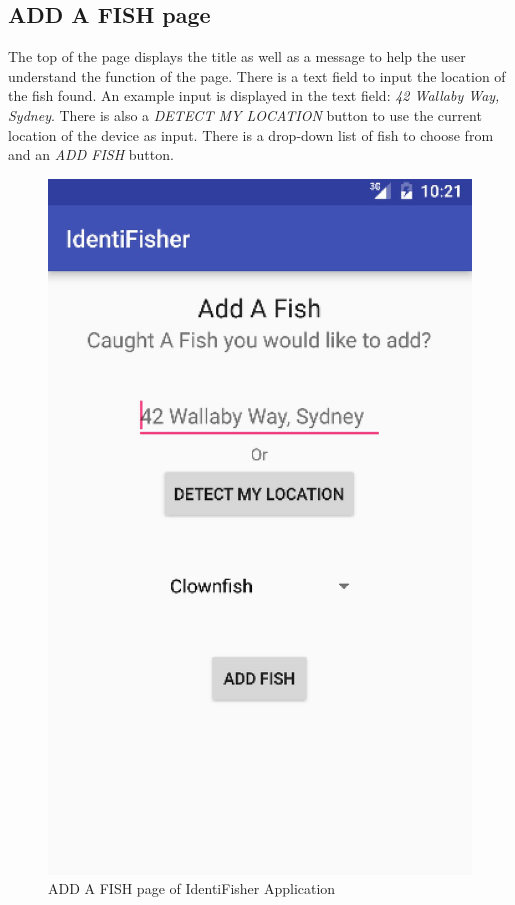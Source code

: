 \documentclass{article}
\begin{document}
\subsection{ADD A FISH page}
The top of the page displays the title as well as a message to help the user understand the function of the page. There is a text field to input the
location of the fish found. An example input is displayed in the text field: \textit{42 Wallaby Way, Sydney}. There is also a \textit{DETECT MY LOCATION} button
to use the current location of the device as input. There is a drop-down list of fish to choose from and an \textit{ADD FISH} button.\\
\begin{figure}[H]
	\includegraphics[scale=0.30]{AddFish.png}
	\caption{ADD A FISH page of IdentiFisher Application}
\end{figure}
\end{document}
